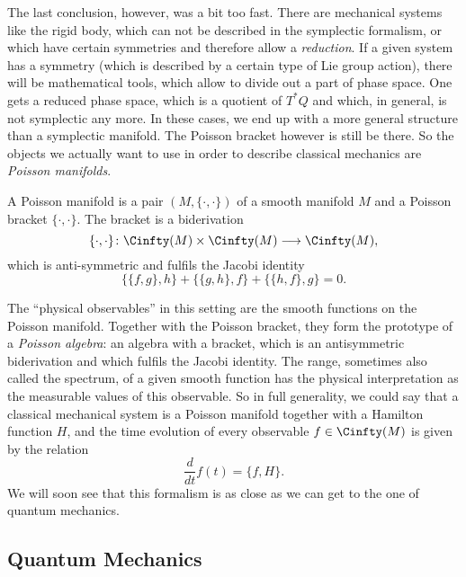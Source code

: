 The last conclusion, however, was a bit too fast. There are mechanical systems 
like the rigid body, which can not be described in the symplectic formalism, 
or which have certain symmetries and therefore allow a \emph{reduction}. If a 
given system has a symmetry (which is described by a certain type of Lie group 
action), there will be mathematical tools, which allow to divide out a part of 
phase space. One gets a reduced phase space, which is a quotient of $T^*Q$ 
and which, in general, is not symplectic any more. In these cases, we end up 
with a more general structure than a symplectic manifold. The Poisson bracket 
however is still be there. So the objects we actually want to use in order to 
describe classical mechanics are \emph{Poisson manifolds}. 
\begin{definition}
	A Poisson manifold is a pair $(M, \{ \cdot, \cdot \})$ of a smooth 
	manifold $M$ and a Poisson bracket $\{ \cdot, \cdot\}$. The bracket is a 
	biderivation
	\begin{equation*}
		\{ \cdot, \cdot \}
		\colon
		\Cinfty(M)
		\times
		\Cinfty(M)
		\longrightarrow
		\Cinfty(M),
	\end{equation*}
	which is anti-symmetric and fulfils the Jacobi identity
	\begin{equation*}
		\{ \{f, g\}, h \}
		+
		\{ \{g, h\}, f \}
		+
		\{ \{h, f\}, g \}
		=
		0.
	\end{equation*}
\end{definition}
The ``physical observables'' in this setting are the smooth functions on the 
Poisson manifold. Together with the Poisson bracket, they form the prototype of a 
\emph{Poisson algebra}: an algebra with a bracket, which is an antisymmetric 
biderivation and which fulfils the Jacobi identity. The range, sometimes also 
called the spectrum, of a given smooth function has the physical interpretation as 
the measurable values of this observable. So in full generality, we could say that 
a classical mechanical system is a Poisson manifold together with a Hamilton 
function $H$, and the time evolution of every observable $f \in \Cinfty(M)$ is 
given by the relation
\begin{equation*}
	\frac{d}{dt} f(t)
	=
	\{f, H\}.
\end{equation*}
We will soon see that this formalism is as close as we can get to the one of 
quantum mechanics.



\subsection{Quantum Mechanics}
\label{subsec:chap2_Quantum}

